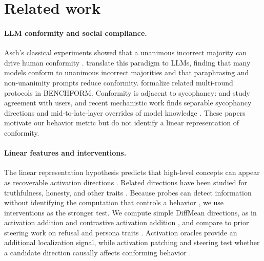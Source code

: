 \documentclass{article}
\begin{document}
\section{Related work}
\label{sec:related-work}

\paragraph{LLM conformity and social compliance.}
Asch's classical experiments showed that a unanimous incorrect majority can
drive human conformity \citep{asch1956studies}. \citet{zhu2025conformity}
translate this paradigm to LLMs, finding that many models conform to unanimous
incorrect majorities and that paraphrasing and non-unanimity prompts reduce conformity. \citet{weng2025benchform} formalize related
multi-round protocols in BENCHFORM. Conformity is adjacent to sycophancy:
\citet{perez2023sycophancy} and \citet{sharma2023sycophancy} study agreement
with users, and recent mechanistic work finds separable sycophancy directions
\citep{vennemeyer2025sycophancy} and mid-to-late-layer overrides of model
knowledge \citep{li2025truthoverridden}. These papers motivate our behavior
metric but do not identify a linear representation of conformity.

\paragraph{Linear features and interventions.}
The linear representation hypothesis predicts that high-level concepts can
appear as recoverable activation directions \citep{park2024linear}. Related
directions have been studied for truthfulness, honesty, and other traits
\citep{burns2023discovering,li2023inference,marks2024geometry}. Because probes
can detect information without identifying the computation that controls a
behavior \citep{alain2017understanding,belinkov2022probing}, we use
interventions as the stronger test. We compute simple DiffMean directions, as in
activation addition and contrastive activation addition
\citep{turner2024activation,panickssery2024caa}, and compare to prior steering
work on refusal and persona traits
\citep{arditi2024refusal,chen2025persona}. Activation oracles
\citep{karvonen2025activation} provide an additional localization signal, while
activation patching and steering test whether a candidate direction causally affects conforming
behavior \citep{meng2022locating,wang2023interpretability}.


\end{document}
